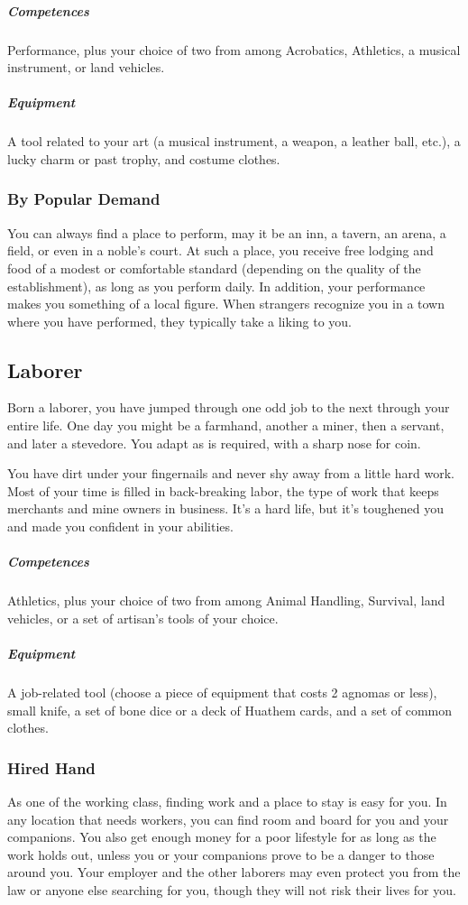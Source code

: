     \subparagraph{Competences} Performance, plus your choice of two from among Acrobatics, Athletics, a musical instrument, or land vehicles.

    \subparagraph{Equipment} A tool related to your art (a musical instrument, a weapon, a leather ball, etc.), a lucky charm or past trophy, and costume clothes.

    \subsubsection{By Popular Demand} \label{feat::bypopulardemand}
        You can always find a place to perform, may it be an inn, a tavern, an arena, a field, or even in a noble's court.
        At such a place, you receive free lodging and food of a modest or comfortable standard (depending on the quality of the establishment), as long as you perform daily.
        In addition, your performance makes you something of a local figure.
        When strangers recognize you in a town where you have performed, they typically take a liking to you.

\subsection*{Laborer} \label{ssec::laborer}
    Born a laborer, you have jumped through one odd job to the next through your entire life.
    One day you might be a farmhand, another a miner, then a servant, and later a stevedore.
    You adapt as is required, with a sharp nose for coin.

    You have dirt under your fingernails and never shy away from a little hard work.
    Most of your time is filled in back-breaking labor, the type of work that keeps merchants and mine owners in business.%
    It’s a hard life, but it’s toughened you and made you confident in your abilities.

    \subparagraph{Competences} Athletics, plus your choice of two from among Animal Handling, Survival, land vehicles, or a set of artisan's tools of your choice.

    \subparagraph{Equipment} A job-related tool (choose a piece of equipment that costs 2 agnomas or less), small knife, a set of bone dice or a deck of Huathem cards, and a set of common clothes.

    \subsubsection{Hired Hand}
        As one of the working class, finding work and a place to stay is easy for you.
        In any location that needs workers, you can find room and board for you and your companions.
        You also get enough money for a poor lifestyle for as long as the work holds out, unless you or your companions prove to be a danger to those around you.
        Your employer and the other laborers may even protect you from the law or anyone else searching for you, though they will not risk their lives for you.


